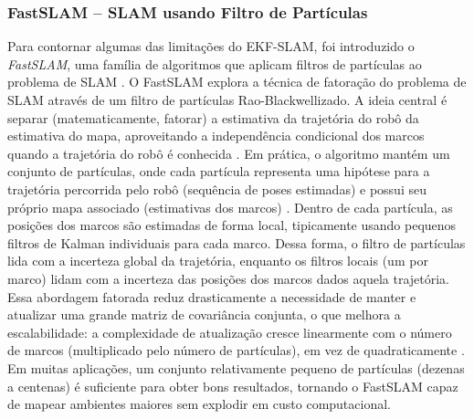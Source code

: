         \subsubsection{FastSLAM – SLAM usando Filtro de Partículas}
        
        Para contornar algumas das limitações do EKF-SLAM, foi introduzido o \textit{FastSLAM}, uma família de algoritmos que aplicam filtros de partículas ao problema de SLAM \cite{Montemerlo2002}\cite{Thrun2005}. O FastSLAM explora a técnica de fatoração do problema de SLAM através de um filtro de partículas Rao-Blackwellizado. A ideia central é separar (matematicamente, fatorar) a estimativa da trajetória do robô da estimativa do mapa, aproveitando a independência condicional dos marcos quando a trajetória do robô é conhecida \cite{Montemerlo2002}. Em prática, o algoritmo mantém um conjunto de partículas, onde cada partícula representa uma hipótese para a trajetória percorrida pelo robô (sequência de poses estimadas) e possui seu próprio mapa associado (estimativas dos marcos) \cite{Thrun2005}. Dentro de cada partícula, as posições dos marcos são estimadas de forma local, tipicamente usando pequenos filtros de Kalman individuais para cada marco. Dessa forma, o filtro de partículas lida com a incerteza global da trajetória, enquanto os filtros locais (um por marco) lidam com a incerteza das posições dos marcos dados aquela trajetória. Essa abordagem fatorada reduz drasticamente a necessidade de manter e atualizar uma grande matriz de covariância conjunta, o que melhora a escalabilidade: a complexidade de atualização cresce linearmente com o número de marcos (multiplicado pelo número de partículas), em vez de quadraticamente \cite{Thrun2005}. Em muitas aplicações, um conjunto relativamente pequeno de partículas (dezenas a centenas) é suficiente para obter bons resultados, tornando o FastSLAM capaz de mapear ambientes maiores sem explodir em custo computacional. 
        
